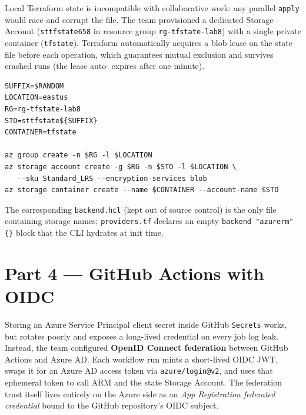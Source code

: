 \documentclass[10pt,a4paper,twocolumn]{article}
\begin{document}
Local Terraform state is incompatible with collaborative work: any
parallel \texttt{apply} would race and corrupt the file. The team
provisioned a dedicated Storage Account
(\texttt{sttfstate658} in resource group \texttt{rg-tfstate-lab8}) with
a single private container (\texttt{tfstate}). Terraform automatically
acquires a blob lease on the state file before each operation, which
guarantees mutual exclusion and survives crashed runs (the lease auto-
expires after one minute).

\begin{lstlisting}[style=shellcode, caption={Bootstrap of the remote state backend (run once)}]
SUFFIX=$RANDOM
LOCATION=eastus
RG=rg-tfstate-lab8
STO=sttfstate${SUFFIX}
CONTAINER=tfstate

az group create -n $RG -l $LOCATION
az storage account create -g $RG -n $STO -l $LOCATION \
   --sku Standard_LRS --encryption-services blob
az storage container create --name $CONTAINER --account-name $STO
\end{lstlisting}

The corresponding \texttt{backend.hcl} (kept out of source control) is
the only file containing storage names; \texttt{providers.tf} declares
an empty \texttt{backend "azurerm" \{\}} block that the CLI hydrates at
init time.

\section{Part 4 --- GitHub Actions with OIDC}

Storing an Azure Service Principal client secret inside GitHub
\texttt{Secrets} works, but rotates poorly and exposes a long-lived
credential on every job log leak. Instead, the team configured
\textbf{OpenID Connect federation} between GitHub Actions and Azure AD.
Each workflow run mints a short-lived OIDC JWT, swaps it for an Azure
AD access token via \texttt{azure/login@v2}, and uses that ephemeral
token to call ARM and the state Storage Account. The federation trust
itself lives entirely on the Azure side as an \emph{App Registration
federated credential} bound to the GitHub repository's OIDC subject.
\end{document}
